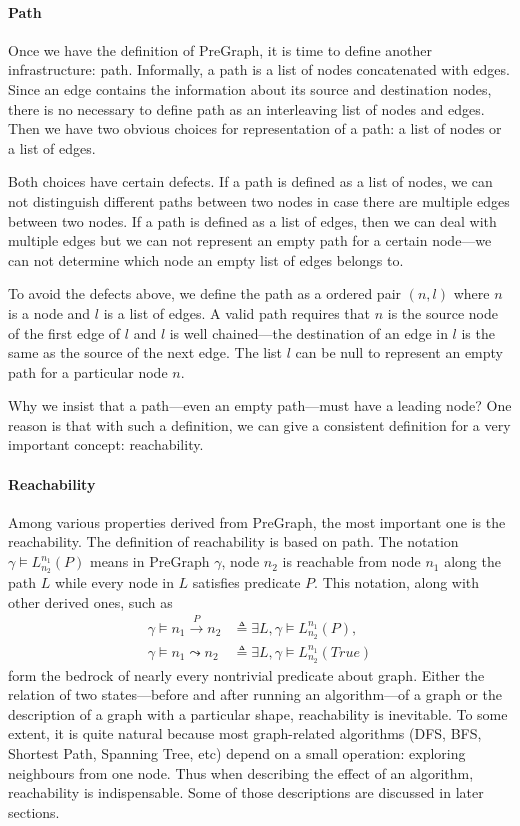 \paragraph{Path}
Once we have the definition of PreGraph, it is time to define another
infrastructure: path. Informally, a path is a list of nodes
concatenated with edges. Since an edge contains the information about
its source and destination nodes, there is no necessary to define path
as an interleaving list of nodes and edges. Then we have two obvious
choices for representation of a path: a list of nodes or a list of
edges.

Both choices have certain defects. If a path is defined as a list of
nodes, we can not distinguish different paths between two nodes in
case there are multiple edges between two nodes. If a path is defined
as a list of edges, then we can deal with multiple edges but we can
not represent an empty path for a certain node---we can not determine
which node an empty list of edges belongs to.

To avoid the defects above, we define the path as a ordered pair $(n,
l)$ where $n$ is a node and $l$ is a list of edges. A valid path
requires that $n$ is the source node of the first edge of $l$ and $l$
is well chained---the destination of an edge in $l$ is the same as the
source of the next edge. The list $l$ can be null to represent an
empty path for a particular node $n$.

Why we insist that a path---even an empty path---must have a leading
node? One reason is that with such a definition, we can give a
consistent definition for a very important concept: reachability.

\paragraph{Reachability}
Among various properties derived from PreGraph, the most important one
is the reachability. The definition of reachability is based on
path. The notation $\gamma \models L_{n_2}^{n_1}(P)$ means in PreGraph
$\gamma$, node $n_2$ is reachable from node $n_1$ along the path $L$
while every node in $L$ satisfies predicate $P$. This notation, along
with other derived ones, such as
\begin{equation*}
\begin{split}
\gamma\models n_1 \xrightarrow{P} n_2 &\triangleq \exists L, \gamma \models L_{n_2}^{n_1}(P),\\
\gamma\models n_1 \leadsto n_2 &\triangleq \exists L, \gamma \models L_{n_2}^{n_1}(True)
\end{split}
\end{equation*}
form the bedrock of nearly every nontrivial predicate about
graph. Either the relation of two states---before and after running an
algorithm---of a graph or the description of a graph with a particular
shape, reachability is inevitable. To some extent, it is quite natural
because most graph-related algorithms (DFS, BFS, Shortest Path,
Spanning Tree, etc) depend on a small operation: exploring neighbours
from one node. Thus when describing the effect of an algorithm,
reachability is indispensable. Some of those descriptions are
discussed in later sections.

